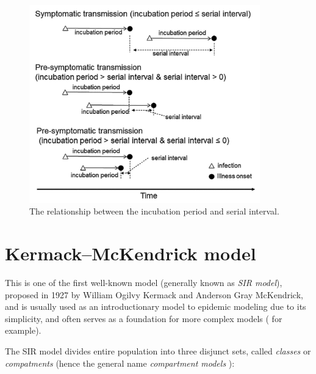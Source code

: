 \documentclass[
  digital, %
  oneside, %
  lof,     %
  lot,     %
]{fithesis4}
\begin{document}
\begin{figure}[h]
  \includegraphics[width=10cm]{static/images/nishiura2020_terms.png}
  \caption{The relationship between the incubation period and serial interval. \cite{nishiura2020}}
  \label{fig:nishiura-transmission}
\end{figure}





\section{Kermack–McKendrick model}

This is one of the first well-known model (generally 
known as \textit{SIR model}), proposed in 1927 by 
William Ogilvy Kermack and Anderson Gray McKendrick, and is 
usually used as an introductionary model to epidemic 
modeling \cite{martcheva2015} due to its simplicity, and
often serves as a foundation for more complex 
models (\cite{clancy2008} for example).

The SIR model divides entire population into three disjunct 
sets, called \textit{classes} or \textit{compatments} (hence the general 
name \textit{compartment models} \cite{bacaer2011}):
\end{document}
